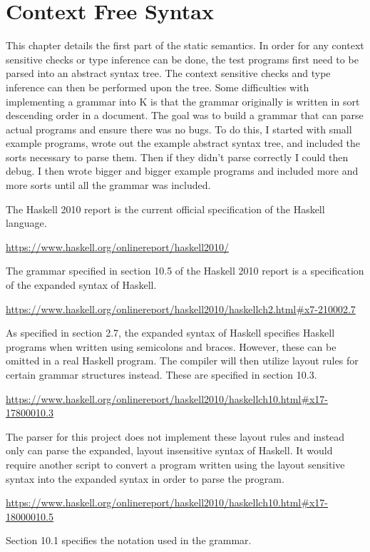 \chapter{Context Free Syntax}
This chapter details the first part of the static semantics. In order for any context sensitive checks or type inference can be done, the test programs first need to be parsed into an abstract syntax tree. The context sensitive checks and type inference can then be performed upon the tree.
Some difficulties with implementing a grammar into K is that the grammar originally is written in sort descending order in a document. The goal was to build a grammar that can parse actual programs and ensure there was no bugs. To do this, I started with small example programs, wrote out the example abstract syntax tree, and included the sorts necessary to parse them. Then if they didn't parse correctly I could then debug. I then wrote bigger and bigger example programs and included more and more sorts until all the grammar was included.

The Haskell 2010 report is the current official specification of the Haskell language. 

\url{https://www.haskell.org/onlinereport/haskell2010/}

The grammar specified in section 10.5 of the Haskell 2010 report is a specification of the expanded syntax of Haskell.

\url{https://www.haskell.org/onlinereport/haskell2010/haskellch2.html#x7-210002.7}

As specified in section 2.7, the expanded syntax of Haskell specifies Haskell programs when written using semicolons and braces. However, these can be omitted in a real Haskell program. The compiler will then utilize layout rules for certain grammar structures instead. These are specified in section 10.3.

\url{https://www.haskell.org/onlinereport/haskell2010/haskellch10.html#x17-17800010.3}

The parser for this project does not implement these layout rules and instead only can parse the expanded, layout insensitive syntax of Haskell. It would require another script to convert a program written using the layout sensitive syntax into the expanded syntax in order to parse the program.

\url{https://www.haskell.org/onlinereport/haskell2010/haskellch10.html#x17-18000010.5}

Section 10.1 specifies the notation used in the grammar.

